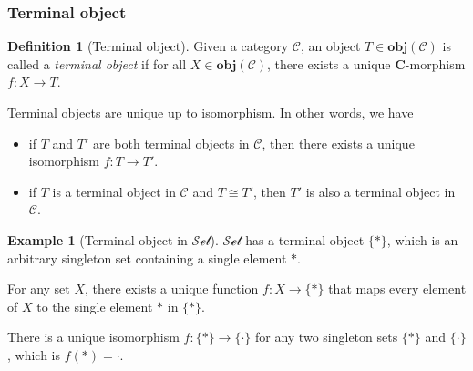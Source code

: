 \documentclass[12pt,twoside,a4paper]{report}
\theoremstyle{definition}
\newtheorem{definition}{Definition}
\theoremstyle{definition}
\theoremstyle{definition}
\newtheorem{example}{Example}
\theoremstyle{definition}
\begin{document}
            \subsubsection{Terminal object}
            \begin{definition}[Terminal object]
                Given a category $\mathcal{C}$, an object $T \in \textbf{obj}(\mathcal{C})$ is called a \emph{terminal object} if for all $X \in \textbf{obj}(\mathcal{C})$, there exists a unique \textbf{C}-morphism $f : X \to T$.
            \end{definition}
            Terminal objects are unique up to isomorphism. In other words, we have
            \begin{itemize}
                \item 
                    if $T$ and $T'$ are both terminal objects in $\mathcal{C}$, then there exists a unique isomorphism $f : T \to T'$.
                \item
                    if $T$ is a terminal object in $\mathcal{C}$ and $T \cong T'$, then $T'$ is also a terminal object in $\mathcal{C}$.
            \end{itemize}
            \begin{example}[Terminal object in $\mathcal{Set}$]
                $\mathcal{Set}$ has a terminal object $\{\ast\}$, which is an arbitrary singleton set containing a single element $\ast$.

                For any set $X$, there exists a unique function $f : X \to \{\ast\}$ that maps every element of $X$ to the single element $\ast$ in $\{\ast\}$.
                
                There is a unique isomorphism $f : \{\ast\} \to \{\cdot\}$ for any two singleton sets $\{\ast\}$ and $\{\cdot\}$, which is $f(\ast) = \cdot$.
            \end{example}

            
\end{document}
